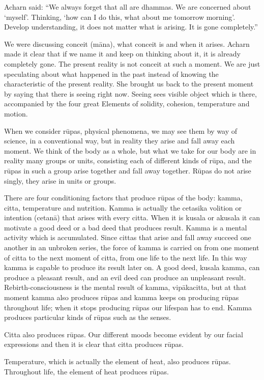 Acharn said: ``We always forget that all are dhammas. We are concerned
about `myself'. Thinking, `how can I do this, what about me tomorrow
morning'. Develop understanding, it does not matter what is arising. It
is gone completely.''

We were discussing conceit (māna), what conceit is and when it arises.
Acharn made it clear that if we name it and keep on thinking about it,
it is already completely gone. The present reality is not conceit at
such a moment. We are just speculating about what happened in the past
instead of knowing the characteristic of the present reality. She
brought us back to the present moment by saying that there is seeing
right now. Seeing sees visible object which is there, accompanied by the
four great Elements of solidity, cohesion, temperature and motion.

When we consider rūpas, physical phenomena, we may see them by way of
science, in a conventional way, but in reality they arise and fall away
each moment. We think of the body as a whole, but what we take for our
body are in reality many groups or units, consisting each of different
kinds of rūpa, and the rūpas in such a group arise together and fall
away together. Rūpas do not arise singly, they arise in units or groups.

There are four conditioning factors that produce rūpas of the body:
kamma, citta, temperature and nutrition. Kamma is actually the cetasika
volition or intention (cetanā) that arises with every citta. When it is
kusala or akusala it can motivate a good deed or a bad deed that
produces result. Kamma is a mental activity which is accumulated. Since
cittas that arise and fall away succeed one another in an unbroken
series, the force of kamma is carried on from one moment of citta to the
next moment of citta, from one life to the next life. In this way kamma
is capable to produce its result later on. A good deed, kusala kamma,
can produce a pleasant result, and an evil deed can produce an
unpleasant result. Rebirth-consciousness is the mental result of kamma,
vipākacitta, but at that moment kamma also produces rūpas and kamma
keeps on producing rūpas throughout life; when it stops producing rūpas
our lifespan has to end. Kamma produces particular kinds of rūpas such
as the senses.

Citta also produces rūpas. Our different moods become evident by our
facial expressions and then it is clear that citta produces rūpas.

Temperature, which is actually the element of heat, also produces rūpas.
Throughout life, the element of heat produces rūpas.

